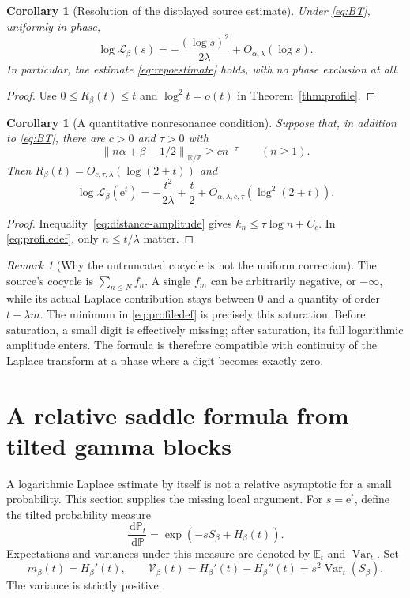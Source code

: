 \documentclass[11pt,a4paper]{article}
\newtheorem{corollary}[theorem]{Corollary}
\theoremstyle{definition}
\theoremstyle{remark}\newtheorem{remark}[theorem]{Remark}
\newcommand{\T}{\mathbb R/\mathbb Z}
\newcommand{\PP}{\mathbb P}
\newcommand{\EE}{\mathbb E}
\newcommand{\Var}{\operatorname{Var}}
\newcommand{\dn}[1]{\left\|#1\right\|_{\T}}
\newcommand{\LL}{\mathcal L}
\newcommand{\VV}{\mathcal V}
\newcommand{\dd}{\,\mathrm d}
\newcommand{\e}{\mathrm e}
\newcommand{\at}{\alpha,\lambda}
\begin{document}
\begin{corollary}[Resolution of the displayed source estimate]
\label{cor:repo}
Under \eqref{eq:BT}, uniformly in phase,
\[
 \log\LL_\beta(s)=-\frac{(\log s)^2}{2\lambda}+O_{\at}(\log s).
\]
In particular, the estimate \eqref{eq:repoestimate} holds, with no phase
exclusion at all.
\end{corollary}
\begin{proof}
Use $0\le R_\beta(t)\le t$ and $\log^2 t=o(t)$ in
Theorem~\ref{thm:profile}.
\end{proof}

\begin{corollary}[A quantitative nonresonance condition]
\label{cor:polynomial}
Suppose that, in addition to \eqref{eq:BT}, there are $c>0$ and $\tau>0$ with
\begin{equation}
 \dn{n\alpha+\beta-1/2}\ge c n^{-\tau}\qquad(n\ge1).
 \label{eq:polynomialphase}
\end{equation}
Then $R_\beta(t)=O_{c,\tau,\lambda}(\log(2+t))$ and
\[
 \log\LL_\beta(\e^t)=-\frac{t^2}{2\lambda}+\frac t2
                     +O_{\alpha,\lambda,c,\tau}(\log^2(2+t)).
\]
\end{corollary}
\begin{proof}
Inequality~\eqref{eq:distance-amplitude} gives
$k_n\le\tau\log n+C_c$.  In \eqref{eq:profiledef}, only
$n\le t/\lambda$ matter.
\end{proof}

\begin{remark}[Why the untruncated cocycle is not the uniform correction]
The source's cocycle is $\sum_{n\le N}f_n$.  A single $f_m$ can be arbitrarily
negative, or $-\infty$, while its actual Laplace contribution stays between
$0$ and a quantity of order $t-\lambda m$.  The minimum in
\eqref{eq:profiledef} is precisely this saturation.  Before saturation, a
small digit is effectively missing; after saturation, its full logarithmic
amplitude enters.  The formula is therefore compatible with continuity of the
Laplace transform at a phase where a digit becomes exactly zero.
\end{remark}

\section{A relative saddle formula from tilted gamma blocks}
\label{sec:saddle}

A logarithmic Laplace estimate by itself is not a relative asymptotic for a
small probability.  This section supplies the missing local argument.  For
$s=\e^t$, define the tilted probability measure
\begin{equation}
 \frac{\dd\PP_t}{\dd\PP}=\exp(-sS_\beta+H_\beta(t)).
 \label{eq:tilt}
\end{equation}
Expectations and variances under this measure are denoted by $\EE_t$ and
$\Var_t$.  Set
\begin{equation}
 m_\beta(t)=H_\beta'(t),\qquad
 \VV_\beta(t)=H_\beta'(t)-H_\beta''(t)
             =s^2\Var_t(S_\beta).
 \label{eq:tiltedparameters}
\end{equation}
The variance is strictly positive.
\end{document}
